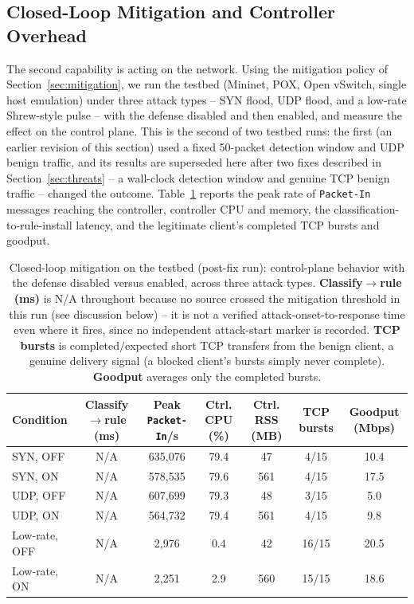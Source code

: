 \documentclass[ASNA,twocolumn]{USG} %
\begin{document}
\subsection{Closed-Loop Mitigation and Controller Overhead}
\label{sec:mitigation_results}

The second capability is acting on the network. Using the mitigation policy of Section~\ref{sec:mitigation}, we run the testbed (Mininet, POX, Open vSwitch, single host emulation) under three attack types -- SYN flood, UDP flood, and a low-rate Shrew-style pulse -- with the defense disabled and then enabled, and measure the effect on the control plane. This is the second of two testbed runs: the first (an earlier revision of this section) used a fixed 50-packet detection window and UDP benign traffic, and its results are superseded here after two fixes described in Section~\ref{sec:threats} -- a wall-clock detection window and genuine TCP benign traffic -- changed the outcome. Table~\ref{tab:mitigation_results} reports the peak rate of \texttt{Packet-In} messages reaching the controller, controller CPU and memory, the classification-to-rule-install latency, and the legitimate client's completed TCP bursts and goodput.

\begin{table}[hbt!]
\centering
\caption{Closed-loop mitigation on the testbed (post-fix run): control-plane behavior with the defense disabled versus enabled, across three attack types. \textbf{Classify$\to$rule (ms)} is N/A throughout because no source crossed the mitigation threshold in this run (see discussion below) -- it is not a verified attack-onset-to-response time even where it fires, since no independent attack-start marker is recorded. \textbf{TCP bursts} is completed$/$expected short TCP transfers from the benign client, a genuine delivery signal (a blocked client's bursts simply never complete). \textbf{Goodput} averages only the completed bursts.}
\label{tab:mitigation_results}
\renewcommand{\arraystretch}{1.2}
\begin{tabular}{|p{2.3cm}|c|c|c|c|c|c|}
\hline
\textbf{Condition} & \textbf{Classify$\to$rule (ms)} & \textbf{Peak \texttt{Packet-In}/s} & \textbf{Ctrl. CPU (\%)} & \textbf{Ctrl. RSS (MB)} & \textbf{TCP bursts} & \textbf{Goodput (Mbps)} \\
\hline
SYN, OFF & N/A & 635{,}076 & 79.4 & 47 & 4/15 & 10.4 \\ \hline
SYN, ON & N/A & 578{,}535 & 79.6 & 561 & 4/15 & 17.5 \\ \hline
UDP, OFF & N/A & 607{,}699 & 79.3 & 48 & 3/15 & 5.0 \\ \hline
UDP, ON & N/A & 564{,}732 & 79.4 & 561 & 4/15 & 9.8 \\ \hline
Low-rate, OFF & N/A & 2{,}976 & 0.4 & 42 & 16/15 & 20.5 \\ \hline
Low-rate, ON & N/A & 2{,}251 & 2.9 & 560 & 15/15 & 18.6 \\ \hline
\end{tabular}
\end{table}
\end{document}
